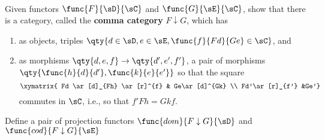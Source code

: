 \documentclass[main.tex]{subfiles}
\begin{document}
\paragraph{}

\begin{exercise}
	Given functors $\func{F}{\sD}{\sC}$ and $\func{G}{\sE}{\sC}$, show that
	there is a category, called the {\bf comma category} $F\downarrow G$, which
	has
	\begin{enumerate}
		\item as objects, triples $\qty{d \in \sD,e \in \sE, \func{f}{Fd}{Ge}
			\in \sC}$, and

		\item as morphisms $\qty{d,e,f}\rightarrow \qty{d',e',f'}$, a pair of
			morphisms $\qty{\func{h}{d}{d'},\func{k}{e}{e'}}$ so that the square
			\[\xymatrix{
					Fd \ar[d]_{Fh} \ar[r]^{f} & Ge\ar[d]^{Gk}  \\
			Fd'\ar[r]_{f'} &Ge'}\]
			commutes in $\sC$, i.e., so that $f' Fh = Gk  f$.
	\end{enumerate}
	Define a pair of projection functors $\func{dom}{F\downarrow G}{\sD}$ and
	$\func{cod}{F\downarrow G}{\sE}$
\end{exercise}
\end{document}
